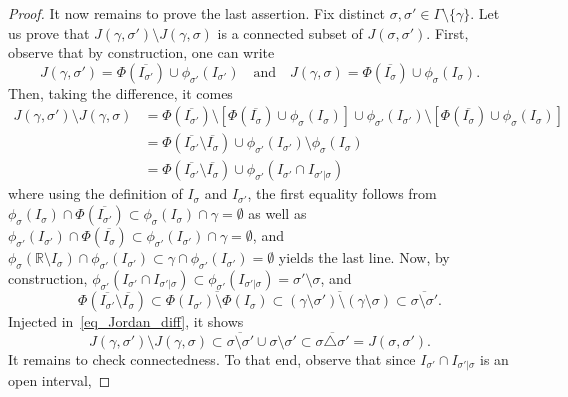 \documentclass[10pt,a4paper]{amsart}
\newcommand{\R}{\mathbb{R}}
\begin{document}
\begin{proof}
    It now remains to prove the last assertion. Fix distinct $\sigma,\sigma'\in\Gamma\setminus\{\gamma\}$. Let us prove that $J(\gamma,\sigma')\setminus J(\gamma,\sigma)$ is a connected subset of $J(\sigma,\sigma')$. First, observe that by construction, one can write
        \[J(\gamma,\sigma')=\Phi(\overline{I_{\sigma'}})\cup \phi_{\sigma'}(I_{\sigma'})\quad\text{and}\quad J(\gamma,\sigma)=\Phi(\overline{I_{\sigma}})\cup \phi_{\sigma}(I_{\sigma}).\]
    Then, taking the difference, it comes
        \begin{equation}
            \label{eq_Jordan_diff}
            \begin{split}
                J(\gamma,\sigma')\setminus J(\gamma,\sigma)&=\Phi(\overline{I_{\sigma'}})\setminus[\Phi(\overline{I_{\sigma}})\cup \phi_{\sigma}(I_{\sigma})]\cup\phi_{\sigma'}(I_{\sigma'})\setminus[\Phi(\overline{I_\sigma})\cup\phi_{\sigma}(I_{\sigma})]\\
                &=\Phi(\overline{{I_{\sigma'}}}\setminus\overline{I_\sigma})\cup\phi_{\sigma'}(I_{\sigma'})\setminus\phi_{\sigma}(I_{\sigma})\\
                &=\Phi(\overline{{I_{\sigma'}}}\setminus\overline{I_\sigma})\cup\phi_{\sigma'}(I_{\sigma'}\cap I_{\sigma'|\sigma})
            \end{split}
        \end{equation}
    where using the definition of $I_\sigma$ and $I_{\sigma'}$, the first equality follows from $\phi_\sigma(I_\sigma)\cap\Phi(\overline{I_{\sigma'}})\subset\phi_\sigma(I_\sigma)\cap\gamma=\emptyset$ as well as $\phi_{\sigma'}(I_{\sigma'})\cap\Phi(\overline{I_\sigma})\subset\phi_{\sigma'}(I_{\sigma'})\cap\gamma=\emptyset$, and $\phi_\sigma(\R\setminus I_{\sigma})\cap\phi_{\sigma'}(I_{\sigma'})\subset\gamma\cap\phi_{\sigma'}(I_{\sigma'})=\emptyset$ yields the last line. Now, by construction, $\phi_{\sigma'}(I_{\sigma'}\cap I_{\sigma'|\sigma})\subset\phi_{\sigma'}(I_{\sigma'|\sigma})=\sigma'\setminus\sigma$, and
        \[\Phi(\overline{{I_{\sigma'}}}\setminus\overline{I_\sigma})\subset\overline{\Phi(I_{\sigma'})\setminus\Phi(I_\sigma)}\subset\overline{(\gamma\setminus\sigma')\setminus(\gamma\setminus\sigma)}\subset\overline{\sigma\setminus\sigma'}.\]
    Injected in~\eqref{eq_Jordan_diff}, it shows
        \[J(\gamma,\sigma')\setminus J(\gamma,\sigma)\subset\overline{\sigma\setminus\sigma'}\cup\sigma\setminus\sigma'\subset \overline{\sigma\triangle\sigma'}=J(\sigma,\sigma').\]
    It remains to check connectedness. To that end, observe that since $I_{\sigma'}\cap I_{\sigma'|\sigma}$ is an open interval,

\end{proof}
\end{document}

